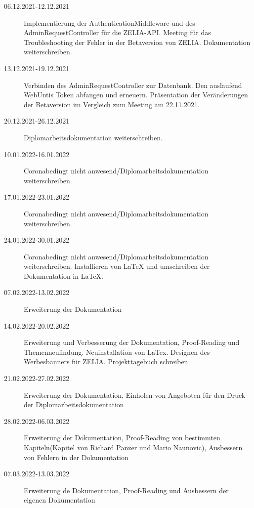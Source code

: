 \begin{description}
    \item[06.12.2021-12.12.2021] Implementierung der AuthenticationMiddleware und des AdminRequestController für die ZELIA-API. Meeting für das Troubleshooting der Fehler in der Betaversion von ZELIA. Dokumentation weiterschreiben. 
    \item[13.12.2021-19.12.2021] Verbinden des AdminRequestController zur Datenbank. Den auslaufend WebUntis Token abfangen und erneuern. Präsentation der Veränderungen der Betaversion im Vergleich zum Meeting am 22.11.2021.
    \item[20.12.2021-26.12.2021] Diplomarbeitsdokumentation weiterschreiben.
    \item[10.01.2022-16.01.2022] Coronabedingt nicht anwesend/Diplomarbeitsdokumentation weiterschreiben.
    \item[17.01.2022-23.01.2022] Coronabedingt nicht anwesend/Diplomarbeitsdokumentation weiterschreiben.
    \item[24.01.2022-30.01.2022] Coronabedingt nicht anwesend/Diplomarbeitsdokumentation weiterschreiben. Installieren von LaTeX und umschreiben der Dokumentation in LaTeX.
    \item[07.02.2022-13.02.2022] Erweiterung der Dokumentation
    \item[14.02.2022-20.02.2022] Erweiterung und Verbesserung der Dokumentation, Proof-Reading und Themenneufindung. Neuinstallation von LaTex. Designen des Werbesbanners für ZELIA. Projekttagebuch schreiben
    \item[21.02.2022-27.02.2022] Erweiterung der Dokumentation, Einholen von Angeboten für den Druck der Diplomarbeitsdokumentation
    \item[28.02.2022-06.03.2022] Erweiterung der Dokumentation, Proof-Reading von bestimmten Kapiteln(Kapitel von Richard Panzer und Mario Naunovic), Ausbessern von Fehlern in der Dokumentation
    \item[07.03.2022-13.03.2022] Erweiterung de Dokumentation, Proof-Reading und Ausbessern der eigenen Dokumentation
\end{description}